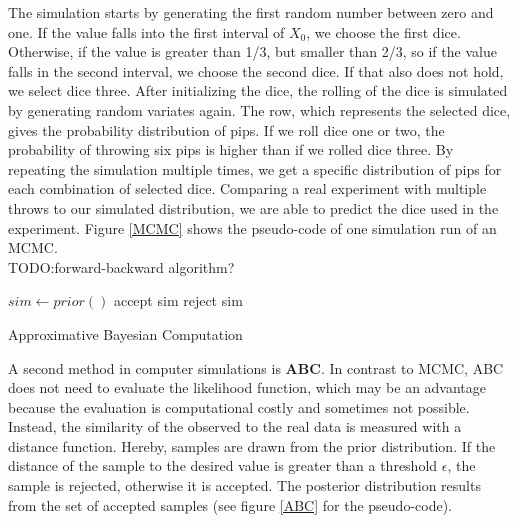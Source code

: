 The simulation starts by generating the first random number between zero and one. If the value falls into the first interval of $X_0$, we choose the first dice. Otherwise, if the value is greater than 1/3, but smaller than 2/3, so if the value falls in the second interval, we choose the second dice. If that also does not hold, we select dice three.\newline
After initializing the dice, the rolling of the dice is simulated by generating random variates again. The row, which represents the selected dice, gives the probability distribution of pips. If we roll dice one or two, the probability of throwing six pips is higher than if we rolled dice three. By repeating the simulation multiple times, we get a specific distribution of pips for each combination of selected dice. Comparing a real experiment with multiple throws to our simulated distribution, we are able to predict the dice used in the experiment. Figure \ref{MCMC} shows the pseudo-code of one simulation run of an MCMC.\\

TODO:forward-backward algorithm?\\

\begin{algorithm}
\begin{algorithmic}
\State $sim \gets prior()$
\State accept sim
\Else
\State reject sim
\EndIf
\end{algorithmic}
\caption{\label{ABC} Approximative Bayesian Computation}
\end{algorithm}

A second method in computer simulations is \textbf{\acf{ABC}}. In contrast to \ac{MCMC}, \ac{ABC} does not need to evaluate the likelihood function, which may be an advantage because the evaluation is computational costly and sometimes not possible. Instead, the similarity of the observed to the real data is measured with a distance function. Hereby, samples are drawn from the prior distribution. If the distance of the sample to the desired value is greater than a threshold $\epsilon$, the sample is rejected, otherwise it is accepted. The posterior distribution results from the set of accepted samples (see figure \ref{ABC} for the pseudo-code)\cite{ABC}.


